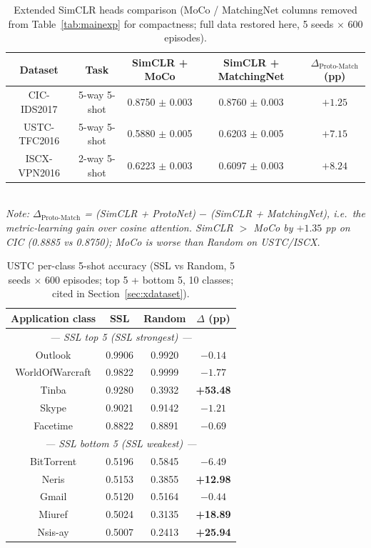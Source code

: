 \documentclass[sensors,article,submit,moreauthors]{Definitions/mdpi}
\begin{document}
\begin{table}[H]
\centering
\small
\caption{Extended SimCLR heads comparison (MoCo / MatchingNet columns removed from Table~\ref{tab:mainexp} for compactness; full data restored here, 5 seeds $\times$ 600 episodes).}
\label{tab:sslheads}
\setlength{\tabcolsep}{4pt}
\begin{tabular}{ccccc}
\toprule
Dataset & Task & SimCLR + MoCo & SimCLR + MatchingNet & $\Delta_{\text{Proto-Match}}$ (pp) \\
\midrule
CIC-IDS2017   & 5-way 5-shot & 0.8750 $\pm$ 0.003 & 0.8760 $\pm$ 0.003 & $+1.25$ \\
USTC-TFC2016  & 5-way 5-shot & 0.5880 $\pm$ 0.005 & 0.6203 $\pm$ 0.005 & $+7.15$ \\
ISCX-VPN2016  & 2-way 5-shot & 0.6223 $\pm$ 0.003 & 0.6097 $\pm$ 0.003 & $+8.24$ \\
\bottomrule
\end{tabular}
\\[0.5ex]
\noindent\textit{Note: $\Delta_{\text{Proto-Match}}$ = (SimCLR + ProtoNet) $-$ (SimCLR + MatchingNet), i.e.\ the metric-learning gain over cosine attention. SimCLR $>$ MoCo by $+1.35$ pp on CIC (0.8885 vs 0.8750); MoCo is worse than Random on USTC/ISCX.}
\end{table}

\begin{table}[H]
\centering
\small
\caption{USTC per-class 5-shot accuracy (SSL vs Random, 5 seeds $\times$ 600 episodes; top 5 + bottom 5, 10 classes; cited in Section~\ref{sec:xdataset}).}
\label{tab:ustcpc}
\setlength{\tabcolsep}{4pt}
\begin{tabular}{cccc}
\toprule
Application class & SSL & Random & $\Delta$ (pp) \\
\midrule
\multicolumn{4}{c}{\textit{--- SSL top 5 (SSL strongest) ---}} \\
Outlook & 0.9906 & 0.9920 & $-0.14$ \\
WorldOfWarcraft & 0.9822 & 0.9999 & $-1.77$ \\
Tinba & 0.9280 & 0.3932 & \textbf{+53.48} \\
Skype & 0.9021 & 0.9142 & $-1.21$ \\
Facetime & 0.8822 & 0.8891 & $-0.69$ \\
\midrule
\multicolumn{4}{c}{\textit{--- SSL bottom 5 (SSL weakest) ---}} \\
BitTorrent & 0.5196 & 0.5845 & $-6.49$ \\
Neris & 0.5153 & 0.3855 & \textbf{+12.98} \\
Gmail & 0.5120 & 0.5164 & $-0.44$ \\
Miuref & 0.5024 & 0.3135 & \textbf{+18.89} \\
Nsis-ay & 0.5007 & 0.2413 & \textbf{+25.94} \\
\bottomrule
\end{tabular}
\end{table}
\end{document}
